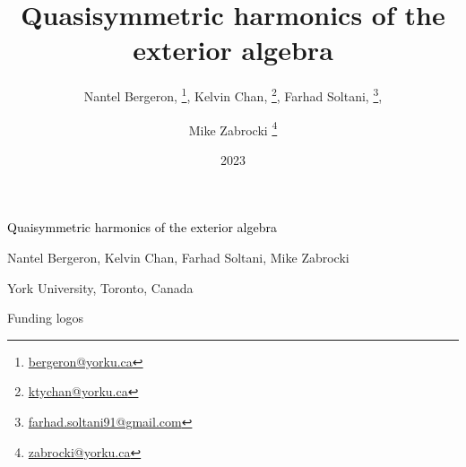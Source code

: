 \documentclass[draft, landscape, 12pt, a4paper]{amsart}
\title{Quasisymmetric harmonics of the exterior algebra}
\author{
  Nantel Bergeron, \thanks{\href{mailto:bergeron@yorku.ca}{bergeron@yorku.ca}}, 
  Kelvin Chan, \thanks{\href{mailto:ktychan@yorku.ca}{ktychan@yorku.ca}},
  Farhad Soltani, \thanks{\href{mailto:farhad.soltani91@gmail.com}{farhad.soltani91@gmail.com}}, \and
  Mike Zabrocki \thanks{\href{mailto:zabrocki@yorku.ca}{zabrocki@yorku.ca}}
}
\date{2023}
\begin{document}
%
%
\begin{mdframed}[backgroundcolor=teal!5, hidealllines=true]
  \centering
  \begin{minipage}[t]{0.6\linewidth}
    {\Large \textcolor{black}{Quaisymmetric harmonics of the exterior algebra}}
    \medskip

    {Nantel Bergeron, Kelvin Chan, Farhad Soltani, Mike Zabrocki} 

    {York University, Toronto, Canada}
  \end{minipage}
  \quad
  \quad
  \begin{minipage}[t]{0.25\linewidth}
    Funding logos
  \end{minipage}
\end{mdframed}

\medskip
\hrulefill{}
\end{document}
